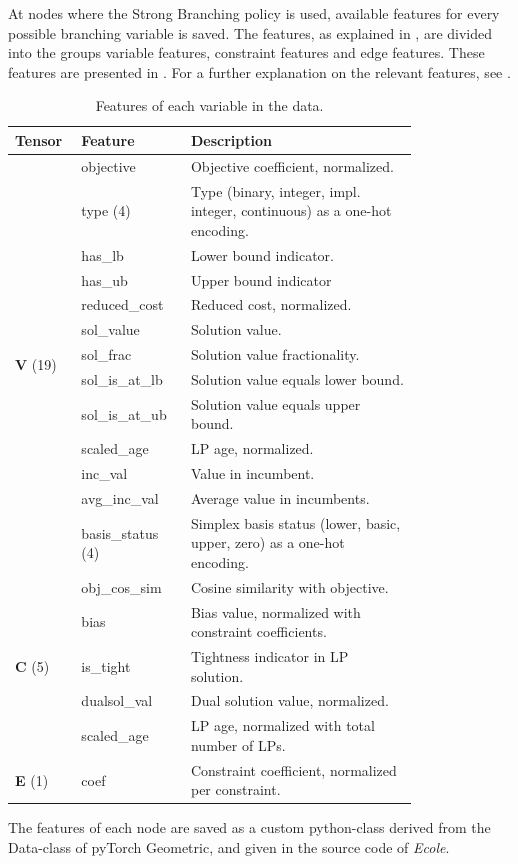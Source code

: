 At nodes where the Strong Branching policy is used, available features for every possible branching variable is saved. The features, as explained in , are divided into the groups variable features, constraint features and edge features. These features are presented in 
 . For a further explanation on the relevant features, see .
%
\renewcommand{\arraystretch}{1.5}
\begin{table}[!h]
	\centering
	\begin{tabular}{p{0.1\linewidth}p{0.2\linewidth}p{0.5\linewidth}}%
		\toprule
		  \textbf{Tensor} & \textbf{Feature} & \textbf{Description} \\ 
		  \toprule
		  \multirow{13}{*}{\textbf{V} (19)} & objective & Objective coefficient, normalized.  \\
		  & type (4) & Type (binary, integer, impl. integer, continuous) as a one-hot encoding. \\
		  & has\_lb & Lower bound indicator. \\
		  & has\_ub & Upper bound indicator \\
		  & reduced\_cost & Reduced cost, normalized. \\
		  & sol\_value & Solution value. \\
          & sol\_frac  & Solution value fractionality.\\
		  & sol\_is\_at\_lb & Solution value equals lower bound.\\
		  & sol\_is\_at\_ub & Solution value equals upper bound.\\
		  & scaled\_age & LP age, normalized. \\
          & inc\_val & Value in incumbent.\\
          & avg\_inc\_val & Average value in incumbents.\\
		  & basis\_status (4) & Simplex basis status (lower, basic, upper, zero) as a one-hot encoding.\\
		  \midrule
		  \multirow{5}{*}{\textbf{C} (5)} & obj\_cos\_sim & Cosine similarity with objective. \\
		  & bias & Bias value, normalized with constraint coefficients. \\
		  & is\_tight & Tightness indicator in LP solution. \\
		  & dualsol\_val & Dual solution value, normalized. \\
		  & scaled\_age & LP age, normalized with total number of LPs. \\
		  \midrule
		  \multirow{1}{*}{\textbf{E} (1)} & coef & Constraint coefficient, normalized per constraint. \\
		\bottomrule
	\end{tabular}
	\caption{Features of each variable in the data. \cite{gasse2019exact}}\label{tab:feats}
\end{table}
%
The features of each node are saved as a custom python-class derived from the Data-class of pyTorch Geometric, and given in the source code of \textit{Ecole}.


